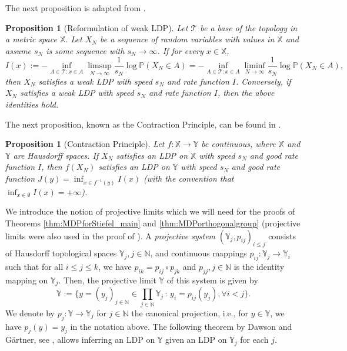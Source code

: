 \documentclass[11pt,a4paper,twoside]{article}
\newcommand{\N}{\mathbb N}
\newtheorem{proposition}[thm]{Proposition}
\theoremstyle{definition}
\begin{document}
\noindent The next proposition is adapted from \cite[Lemma 4.1.11 and Lemma 4.1.18]{dembo2009techniques}.
\begin{proposition}[Reformulation of weak LDP]\label{prop:weak-ldp-base}
		Let $\mathcal{T}$ be a base of the topology in a metric space $\mathbb{X}$. Let $X_N$ be a sequence of random variables with values in $\mathbb{X}$ and assume $s_N$ is some sequence with $s_N\to\infty$. If for every $x\in \mathbb{X}$,
		\[
		  I(x)
		  := - \inf_{A\in\mathcal{T} : x\in A}
			   \limsup_{N\to\infty}\frac{1}{s_N}\log \mathbb{P}(X_N\in A)
			= - \inf_{A\in\mathcal{T} : x\in A}
			   \liminf_{N\to\infty}\frac{1}{s_N}\log \mathbb{P}(X_N\in A),
		\]
		then $X_N$ satisfies a weak LDP with speed $s_N$ and rate function $I$.  Conversely, if $X_N$ satisfies a weak LDP with speed $s_N$ and rate function $I$, then the above identities hold.
	\end{proposition}
		

\noindent The next proposition, known as the Contraction Principle, can be found in \cite[Theorem 4.2.1]{dembo2009techniques}.

\begin{proposition}[Contraction Principle]\label{prop:contractionprinciple_main}
			Let $f:\mathbb{X}\to\mathbb{Y}$ be continuous, where $\mathbb{X}$ and $\mathbb{Y}$ are Hausdorff spaces. If $X_{N}$ satisfies an LDP on $\mathbb{X}$ with speed $s_N$ and good rate function $I$, then $f(X_N)$ satisfies an LDP on $\mathbb{Y}$ with speed $s_N$ and good rate function $J(y) = \inf_{x\in f^{-1}(y)}I(x)$ (with the convention that $\inf_{x\in \emptyset}I(x) = +\infty$). 
	\end{proposition}

	We introduce the notion of projective limits which we will need for the proofs of Theorems \ref{thm:MDPforStiefel_main} and \ref{thm:MDPorthogonalgroup} (projective limits were also used in the proof of \cite[Theorem A]{KabluchkoLarge}). A \emph{projective system} $\left(\mathbb{Y}_j, p_{i j}\right)_{i \leq j}$ consists of Hausdorff topological spaces $\mathbb{Y}_j, j \in \mathbb{N}$, and continuous mappings $p_{i j}: \mathbb{Y}_j \rightarrow \mathbb{Y}_i$ such that for all $i \leq j \leq k$, we have $p_{i k}=p_{i j} \circ p_{j k}$ and $p_{j j}, j \in \mathbb{N}$ is the identity mapping on $\mathbb{Y}_j$. Then, the projective limit $\mathbb{Y}$ of this system is given by
	$$
\mathbb{Y}:=\Big\{y=\left(y_j\right)_{j \in \mathbb{N}} \in \prod_{j \in \mathbb{N}} \mathbb{Y}_j \,:\, y_i=p_{i j}\left(y_j\right), \forall i<j\Big\}.
        $$
        We denote by $p_j:\mathbb{Y}\to \mathbb{Y}_j$ for $j\in\N$ the canonical projection, i.e., for $y\in\mathbb{Y}$, we have $p_j(y) = y_j$ in the notation above. The following theorem by Dawson and G\"artner, see \cite[Theorem 3.3]{dawsont1987large}, allows inferring an LDP on $\mathbb{Y}$ given an LDP on $\mathbb{Y}_j$ for each $j$.
	
\end{document}
